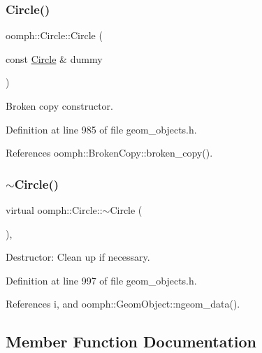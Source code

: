 \subsubsection{\texorpdfstring{Circle()}{Circle()}\hspace{0.1cm}{\footnotesize\ttfamily [4/4]}}
{\footnotesize\ttfamily oomph\+::\+Circle\+::\+Circle (\begin{DoxyParamCaption}\item[{const \hyperlink{classoomph_1_1Circle}{Circle} \&}]{dummy }\end{DoxyParamCaption})\hspace{0.3cm}{\ttfamily [inline]}}



Broken copy constructor. 



Definition at line 985 of file geom\+\_\+objects.\+h.



References oomph\+::\+Broken\+Copy\+::broken\+\_\+copy().

\mbox{\label{classoomph_1_1Circle_a5562fd890f75662193e61661dfcd6270}} 
\subsubsection{\texorpdfstring{$\sim$\+Circle()}{~Circle()}}
{\footnotesize\ttfamily virtual oomph\+::\+Circle\+::$\sim$\+Circle (\begin{DoxyParamCaption}{ }\end{DoxyParamCaption})\hspace{0.3cm}{\ttfamily [inline]}, {\ttfamily [virtual]}}



Destructor\+: Clean up if necessary. 



Definition at line 997 of file geom\+\_\+objects.\+h.



References i, and oomph\+::\+Geom\+Object\+::ngeom\+\_\+data().



\subsection{Member Function Documentation}
\mbox{\label{classoomph_1_1Circle_ab48e086bc4f484e155ebb2edd6e90040}} 
